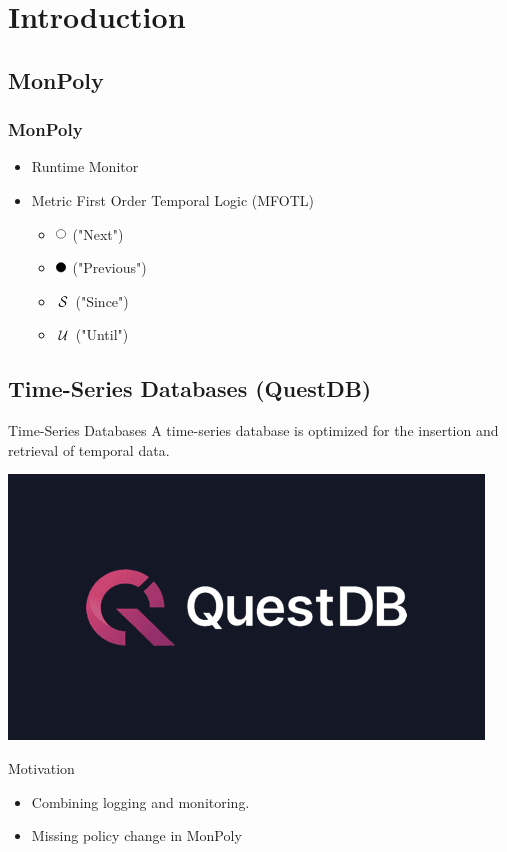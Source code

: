\section{Introduction}
\subsection{MonPoly}

\begin{frame}
    \frametitle{MonPoly}
    \begin{itemize}
        \item Runtime Monitor
        \item Metric First Order Temporal Logic (MFOTL)
        \begin{itemize}
            \item $\Next{}$ ("Next")
            \item $\Previous{}$ ("Previous")
            \item $\,\mathcal{S}_{}\,$ ("Since")
            \item $\,\mathcal{U}_{}\,$ ("Until")
        \end{itemize}
    \end{itemize}
\end{frame}


\subsection{Time-Series Databases (QuestDB)}

\begin{frame}{Time-Series Databases}
    A time-series database is optimized for the insertion and retrieval of temporal data.

    \vspace{1.2cm}
    \centering
    \includegraphics[width=0.7\linewidth]{diagrams/questdb.png}
    
\end{frame}


\begin{frame}{Motivation}
    \begin{itemize}
        \item Combining logging and monitoring.
        \item Missing policy change in MonPoly
    \end{itemize}
    
\end{frame}